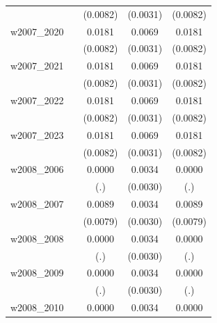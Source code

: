 \begin{table}[htbp]
\begin{tabular}{l*{4}{c}}
            &                     &    (0.0082)         &    (0.0031)         &    (0.0082)         \\
[1em]
w2007\_2020  &                     &      0.0181\sym{**} &      0.0069\sym{**} &      0.0181\sym{**} \\
            &                     &    (0.0082)         &    (0.0031)         &    (0.0082)         \\
[1em]
w2007\_2021  &                     &      0.0181\sym{**} &      0.0069\sym{**} &      0.0181\sym{**} \\
            &                     &    (0.0082)         &    (0.0031)         &    (0.0082)         \\
[1em]
w2007\_2022  &                     &      0.0181\sym{**} &      0.0069\sym{**} &      0.0181\sym{**} \\
            &                     &    (0.0082)         &    (0.0031)         &    (0.0082)         \\
[1em]
w2007\_2023  &                     &      0.0181\sym{**} &      0.0069\sym{**} &      0.0181\sym{**} \\
            &                     &    (0.0082)         &    (0.0031)         &    (0.0082)         \\
[1em]
w2008\_2006  &                     &      0.0000         &      0.0034         &      0.0000         \\
            &                     &         (.)         &    (0.0030)         &         (.)         \\
[1em]
w2008\_2007  &                     &      0.0089         &      0.0034         &      0.0089         \\
            &                     &    (0.0079)         &    (0.0030)         &    (0.0079)         \\
[1em]
w2008\_2008  &                     &      0.0000         &      0.0034         &      0.0000         \\
            &                     &         (.)         &    (0.0030)         &         (.)         \\
[1em]
w2008\_2009  &                     &      0.0000         &      0.0034         &      0.0000         \\
            &                     &         (.)         &    (0.0030)         &         (.)         \\
[1em]
w2008\_2010  &                     &      0.0000         &      0.0034         &      0.0000         \\

\end{tabular}
\end{table}

